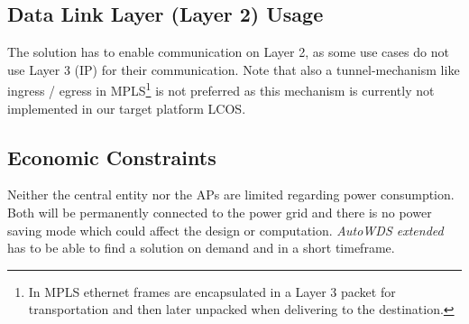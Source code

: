     \subsection{Data Link Layer (Layer 2) Usage}
      The solution has to enable communication on Layer 2, as some use cases do not use Layer 3 (\ac{IP}) for their communication.
      Note that also a tunnel-mechanism like ingress / egress in \ac{MPLS}\footnote{In \ac{MPLS} ethernet frames are encapsulated in 
      a Layer 3 packet for transportation and then later unpacked when delivering to the destination.} \cite{mpls}
      is not preferred as this mechanism is currently not implemented in our target platform \ac{LCOS}.
    
    \subsection{Economic Constraints}
      Neither the central entity nor the APs are limited regarding power consumption. 
      Both will be permanently connected to the power grid and there is no power saving mode which could affect the design or computation.
      \textit{AutoWDS extended} has to be able to find a solution on demand and in a short timeframe.
  